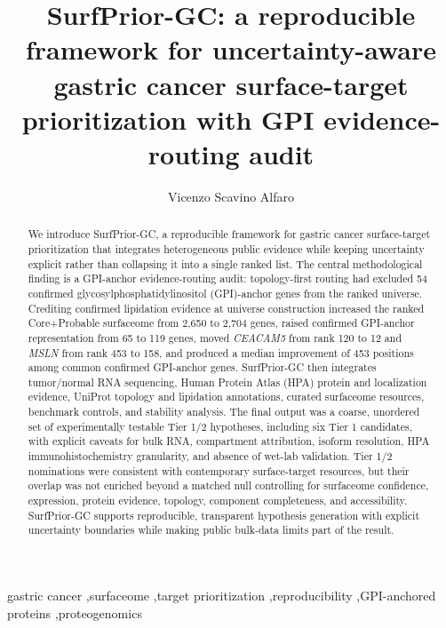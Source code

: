 \documentclass[preprint,12pt,authoryear]{elsarticle}
\begin{document}
\begin{frontmatter}

\title{SurfPrior-GC: a reproducible framework for uncertainty-aware gastric cancer surface-target prioritization with GPI evidence-routing audit}
\author[aff1]{Vicenzo Scavino Alfaro}

\begin{abstract}
We introduce SurfPrior-GC, a reproducible framework for gastric cancer surface-target prioritization that integrates heterogeneous public evidence while keeping uncertainty explicit rather than collapsing it into a single ranked list. The central methodological finding is a GPI-anchor evidence-routing audit: topology-first routing had excluded 54 confirmed glycosylphosphatidylinositol (GPI)-anchor genes from the ranked universe. Crediting confirmed lipidation evidence at universe construction increased the ranked Core+\allowbreak{}Probable surfaceome from 2,650 to 2,704 genes, raised confirmed GPI-anchor representation from 65 to 119 genes, moved \textit{CEACAM5} from rank 120 to 12 and \textit{MSLN} from rank 453 to 158, and produced a median improvement of 453 positions among common confirmed GPI-anchor genes. SurfPrior-GC then integrates tumor/\allowbreak{}normal RNA sequencing, Human Protein Atlas (HPA) protein and localization evidence, UniProt topology and lipidation annotations, curated surfaceome resources, benchmark controls, and stability analysis. The final output was a coarse, unordered set of experimentally testable Tier 1/\allowbreak{}2 hypotheses, including six Tier 1 candidates, with explicit caveats for bulk RNA, compartment attribution, isoform resolution, HPA immunohistochemistry granularity, and absence of wet-lab validation. Tier 1/\allowbreak{}2 nominations were consistent with contemporary surface-target resources, but their overlap was not enriched beyond a matched null controlling for surfaceome confidence, expression, protein evidence, topology, component completeness, and accessibility. SurfPrior-GC supports reproducible, transparent hypothesis generation with explicit uncertainty boundaries while making public bulk-data limits part of the result.
\end{abstract}

\begin{keyword}
gastric cancer \sep surfaceome \sep target prioritization \sep reproducibility \sep GPI-anchored proteins \sep proteogenomics
\end{keyword}

\end{frontmatter}
\end{document}
